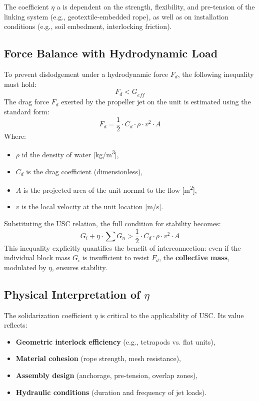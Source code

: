\documentclass[Journal,letterpaper]{ascelike-new}
\begin{document}
The coefficient $\eta $ a is dependent on the strength, flexibility, and pre-tension of the linking system (e.g., geotextile-embedded rope), as well as on installation conditions (e.g., soil embedment, interlocking friction).

\subsection{Force Balance with Hydrodynamic Load}

To prevent dislodgement under a hydrodynamic force $F_d$, the following inequality must hold:
\[{F_d<G}_{eff}\]
The drag force $F_d$ exerted by the propeller jet on the unit is estimated using the standard form:
\[F_d=\frac{1}{2}\cdot C_d\cdot \rho \cdot v^2\cdot A\]
Where:
\begin{itemize}
\item  $\rho $ id the density of water [kg/m\textsuperscript{3}],

\item  $C_d$ is the drag coefficient (dimensionless),

\item  $A$ is the projected area of the unit normal to the flow [m\textsuperscript{2}],

\item  $v$ is the local velocity at the unit location [m/s].
\end{itemize}

Substituting the USC relation, the full condition for stability becomes:
\[G_i+\eta \cdot \sum{G_n}>\frac{1}{2}\cdot C_d\cdot \rho \cdot v^2\cdot A\]
This inequality explicitly quantifies the benefit of interconnection: even if the individual block mass $G_i$ is insufficient to resist $F_d$, the \textbf{collective mass}, modulated by $\eta $, ensures stability.

\subsection{Physical Interpretation of ${\eta }$}

The solidarization coefficient $\eta $ is critical to the applicability of USC. Its value reflects:

\begin{itemize}
\item  \textbf{Geometric interlock efficiency} (e.g., tetrapods vs. flat units),

\item  \textbf{Material cohesion} (rope strength, mesh resistance),

\item  \textbf{Assembly design} (anchorage, pre-tension, overlap zones),

\item  \textbf{Hydraulic conditions} (duration and frequency of jet loads).
\end{itemize}
\end{document}
